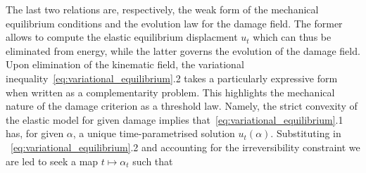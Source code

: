 The last two relations are, respectively, the weak form of the mechanical equilibrium conditions and the  evolution law  for the damage field.
The former allows to compute the elastic equilibrium displacment $u_t$ which can thus be eliminated from energy, while the latter governs the evolution of the damage field.
Upon elimination of the kinematic field, the variational inequality~\eqref{eq:variational_equilibrium}.2 takes a particularly expressive form when written as a complementarity problem. This highlights the mechanical nature of the damage criterion as a threshold law.
Namely, the strict convexity of the elastic model for given damage implies that~\eqref{eq:variational_equilibrium}.1 has, for given $\alpha$, a unique time-parametrised solution $u_t(\alpha)$. 
Substituting in ~\eqref{eq:variational_equilibrium}.2 and accounting for the irreversibility constraint we are led to seek a map $t\mapsto\alpha_t$ such that 
